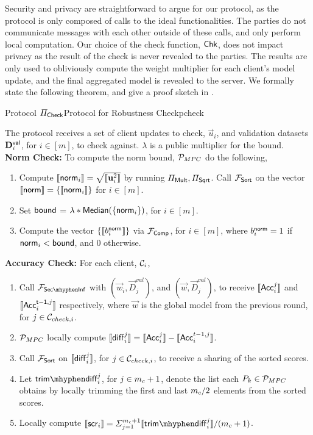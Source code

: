  Security and privacy are straightforward to argue for our protocol, as the protocol is only composed of calls to the ideal functionalities. The parties do not communicate messages with each other outside of these calls, and only perform local computation. Our choice of the check function, $\msf{Chk}$, does not impact privacy as the result of the check is never revealed to the parties. The results are only used to obliviously compute the weight multiplier for each client's model update, and the final aggregated model is revealed to the server.
We formally state the following theorem, and give a proof sketch in .


\begin{protofig}{Protocol $\PCheck$}{Protocol for Robustness Check}{pcheck}
\label{proto:pcheck}

The protocol receives a set of client updates to check, $\vec u_i$, and validation datasets $\vec D^{\msf{val}}_i$, for $i \in [m]$, to check against. $\lambda$ is a public multiplier for the bound. \\

\textbf{Norm Check:} To compute the norm bound, $\mpcnodes$ do the following,
\begin{enumerate}
    \item Compute $\arith{\msf{norm}_i} = \sqrt{\arith{\vec u_i^2}}$ by running $\PMult, \PSqrt$. Call $\FSort$ on the vector $\arith{\msf{norm}} = \{ \arith{\msf{norm}_i} \}$ for $i \in [m]$. 
    \item Set $\msf{bound}$ = $\lambda * \msf{Median}(\{ \msf{norm}_i \})$, for $i \in [m]$. 
    \item Compute the vector $\{ \arith{b^{\msf{norm}}_i} \}$ via $\FComp$, for $i \in [m]$, where $b^{\msf{norm}}_i = 1$ if $\msf{norm}_i < \msf{bound}$, and 0 otherwise.
\end{enumerate}

\textbf{Accuracy Check:} For each client, $\calC_i$,
\begin{enumerate}
    \item Call $\FSecInf$ with $(\vec w_i, \vec D^{val}_j)$, and $(\vec w, \vec D^{val}_j)$, to receive $\arith{\Acc{i}{j}}$ and $\arith{\Acc{i}{\msf{t - 1}, j}}$ respectively, where $\vec w$ is the global model from the previous round, for $j \in \calC_{check, i}$.
    \item $\mpcnodes$ locally compute $\arith{\diff{i}{j}} = \arith{\Acc{i}{j}} - \arith{\Acc{i}{t - 1, j}}$.
    \item Call $\FSort$ on $\arith{\diff{i}{j}}$, for $j \in \calC_{check, i}$, to receive a sharing of the sorted scores.
    \item Let $\msf{trim \mhyphen diff}^j_i$, for $j \in \cor + 1$, denote the list each $P_k \in \mpcnodes$ obtains by locally trimming the first and last $\cor/2$ elements from the sorted scores. 
    \item Locally compute $\arith{\msf{scr}_i} = \Sigma_{j = 1}^{\cor + 1} \arith{\msf{trim \mhyphen diff}^j_i} / (\cor + 1)$. 
\end{enumerate}


\end{protofig}
